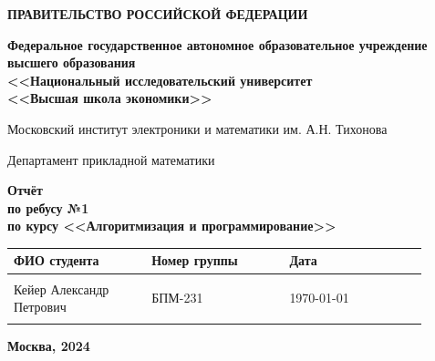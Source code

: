 \documentclass[12pt]{article}
\begin{document}
	
	\thispagestyle{empty}
	\begin{center}
		\textbf{ПРАВИТЕЛЬСТВО РОССИЙСКОЙ ФЕДЕРАЦИИ}
		
		\vspace{5ex}
		
		\textbf{Федеральное государственное автономное образовательное учреждение \\ высшего образования \\ <<Национальный исследовательский университет \\ <<Высшая школа экономики>>}
	\end{center}
	\vspace{5ex}
	
	\begin{center}
		Московский институт электроники и математики им. А.Н. Тихонова  
		
		\vspace{5ex}
		
		Департамент прикладной математики
		
		\vspace{10ex}
		\textbf{Отчёт \\ по ребусу №1 \\ по курсу <<Алгоритмизация и программирование>>}
		\vspace{7ex}
		
	\end{center}
	
	\begin{center} 
		\begin{tabular}{| p{0.3\linewidth}| p{0.3\linewidth}| p{0.3\linewidth}|}
			\hline	
			ФИО студента & Номер группы & Дата \\  \hline
			& & \\  
			Кейер Александр \newline Петрович & БПМ-231 & \today\\  
			& & \\  \hline		
		\end{tabular}
	\end{center}
	
	\begin{center}
		\vspace{3ex}
		
		\vfill
		
		\normalsize
		
		\textbf{Москва, 2024}
	\end{center}
	
	\newpage
	
	
\end{document}
